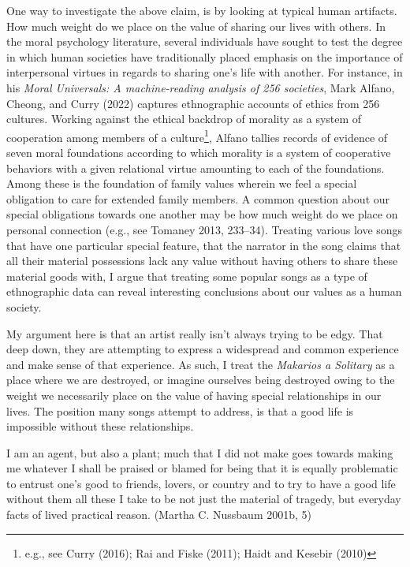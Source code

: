 \documentclass[
  letterpaper,
  DIV=11,
  numbers=noendperiod]{scrartcl}
\theoremstyle{remark}
\begin{document}
One way to investigate the above claim, is by looking at typical human
artifacts. How much weight do we place on the value of sharing our lives
with others. In the moral psychology literature, several individuals
have sought to test the degree in which human societies have
traditionally placed emphasis on the importance of interpersonal virtues
in regards to sharing one's life with another. For instance, in his
\emph{Moral Universals: A machine-reading analysis of 256 societies},
Mark Alfano, Cheong, and Curry (2022) captures ethnographic accounts of
ethics from 256 cultures. Working against the ethical backdrop of
morality as a system of cooperation among members of a
culture\footnote{e.g., see Curry (2016); Rai and Fiske (2011); Haidt and
  Kesebir (2010)}, Alfano tallies records of evidence of seven moral
foundations according to which morality is a system of cooperative
behaviors with a given relational virtue amounting to each of the
foundations. Among these is the foundation of family values wherein we
feel a special obligation to care for extended family members. A common
question about our special obligations towards one another may be how
much weight do we place on personal connection (e.g., see Tomaney 2013,
233--34). Treating various love songs that have one particular special
feature, that the narrator in the song claims that all their material
possessions lack any value without having others to share these material
goods with, I argue that treating some popular songs as a type of
ethnographic data can reveal interesting conclusions about our values as
a human society.

My argument here is that an artist really isn't always trying to be
edgy. That deep down, they are attempting to express a widespread and
common experience and make sense of that experience. As such, I treat
the \emph{Makarios a Solitary} as a place where we are destroyed, or
imagine ourselves being destroyed owing to the weight we necessarily
place on the value of having special relationships in our lives. The
position many songs attempt to address, is that a good life is
impossible without these relationships.

I am an agent, but also a plant; much that I did not make goes towards
making me whatever I shall be praised or blamed for being that it is
equally problematic to entrust one's good to friends, lovers, or country
and to try to have a good life without them all these I take to be not
just the material of tragedy, but everyday facts of lived practical
reason. (Martha C. Nussbaum 2001b, 5)
\end{document}
